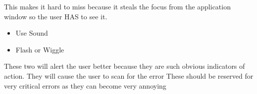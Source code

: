 \documentclass[11pt,]{article}
\providecommand{\tightlist}{%
  \setlength{\itemsep}{0pt}\setlength{\parskip}{0pt}}
\begin{document}
This makes it hard to miss because it steals the focus from the
application window so the user HAS to see it.

\begin{itemize}
\tightlist
\item
  Use Sound
\item
  Flash or Wiggle
\end{itemize}

These two will alert the user better because they are such obvious
indicators of action. They will cause the user to scan for the error
These should be reserved for very critical errors as they can become
very annoying
\end{document}
